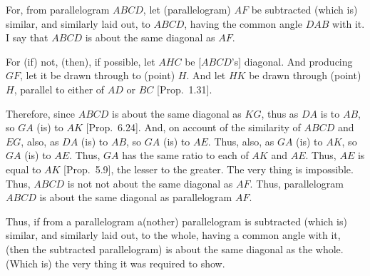 \begin{Parallel}{}{}
{For, from parallelogram $ABCD$, let (parallelogram) $AF$ be
subtracted (which is) similar, and similarly laid out,  to $ABCD$,
having  the common angle $DAB$ with it. I say that $ABCD$ is about
the same diagonal as $AF$.

\epsfysize=2in
\centerline{}

For (if) not, (then), if possible, let $AHC$ be [$ABCD$'s] diagonal. And producing
$GF$, let it be drawn through to (point) $H$. And let $HK$ 
be drawn through (point) $H$, parallel to either of $AD$ or $BC$  [Prop.~1.31].

Therefore, since $ABCD$ is about the same diagonal as $KG$, thus as
$DA$ is to $AB$, so $GA$ (is) to $AK$ [Prop.~6.24].
And, on account of the similarity of $ABCD$ and $EG$, also, as $DA$ (is)
to $AB$, so $GA$ (is) to $AE$. Thus, also, as $GA$ (is) to $AK$, so $GA$ (is)
to $AE$. Thus, $GA$ has the same ratio  to each of $AK$ and $AE$. Thus, 
$AE$ is equal to $AK$ [Prop.~5.9], the
lesser to the greater. The very thing is impossible. Thus, $ABCD$ is not not
about the same diagonal as $AF$. Thus, parallelogram $ABCD$ is
about the same diagonal as parallelogram $AF$.

Thus, if from a parallelogram a(nother) parallelogram
is subtracted (which is) similar, and similarly laid out, to the whole,
having a common angle with it, (then the subtracted parallelogram) is about the same diagonal
as the whole. (Which is) the very thing it was required to show.}
\end{Parallel}

